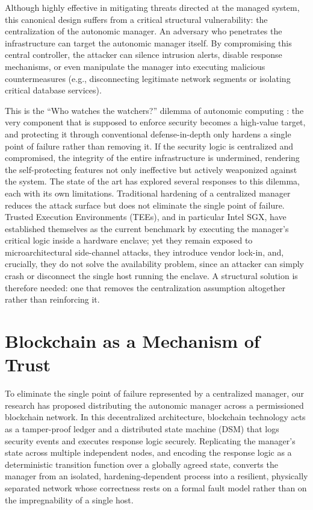Although highly effective in mitigating threats directed at the managed system, this canonical design suffers from a critical structural vulnerability: the centralization of the autonomic manager. An adversary who penetrates the infrastructure can target the autonomic manager itself. By compromising this central controller, the attacker can silence intrusion alerts, disable response mechanisms, or even manipulate the manager into executing malicious countermeasures (e.g., disconnecting legitimate network segments or isolating critical database services).

This is the ``Who watches the watchers?'' dilemma of autonomic computing \cite{chess2003security, pekaric2023systematic}: the very component that is supposed to enforce security becomes a high-value target, and protecting it through conventional defense-in-depth only hardens a single point of failure rather than removing it. If the security logic is centralized and compromised, the integrity of the entire infrastructure is undermined, rendering the self-protecting features not only ineffective but actively weaponized against the system. The state of the art has explored several responses to this dilemma, each with its own limitations. Traditional hardening of a centralized manager \cite{pekaric2023systematic} reduces the attack surface but does not eliminate the single point of failure. Trusted Execution Environments (TEEs), and in particular Intel SGX, have established themselves as the current benchmark by executing the manager's critical logic inside a hardware enclave; yet they remain exposed to microarchitectural side-channel attacks, they introduce vendor lock-in, and, crucially, they do not solve the availability problem, since an attacker can simply crash or disconnect the single host running the enclave. A structural solution is therefore needed: one that removes the centralization assumption altogether rather than reinforcing it.

\section{Blockchain as a Mechanism of Trust}
\label{sec:intro_blockchain}

To eliminate the single point of failure represented by a centralized manager, our research \cite{albero2026blockchain} has proposed distributing the autonomic manager across a permissioned blockchain network. In this decentralized architecture, blockchain technology acts as a tamper-proof ledger and a distributed state machine (DSM) that logs security events and executes response logic securely. Replicating the manager's state across multiple independent nodes, and encoding the response logic as a deterministic transition function over a globally agreed state, converts the manager from an isolated, hardening-dependent process into a resilient, physically separated network whose correctness rests on a formal fault model rather than on the impregnability of a single host.


